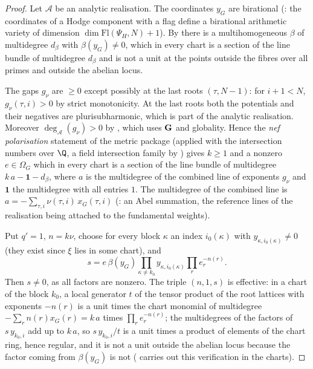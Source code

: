 \begin{proof}
Let $\mathcal A$ be an analytic realisation. The coordinates $y_G$ are birational
(: the coordinates of a Hodge component with a flag define
a birational arithmetic variety of dimension $\dim\mathrm{Fl}(\Psi_H,N)+1$). By
 there is a multihomogeneous $\beta$ of multidegree
$d_\beta$ with $\beta(y_G)\ne0$, which in every chart is a section of the line bundle of multidegree $d_\beta$ and is
not a unit at the points outside the fibres over all primes and outside the abelian locus.

The gaps $g_\nu$ are $\ge0$ except possibly at the last roots $(\tau,N-1)$: for $i+1<N$, $g_\nu(\tau,i)>0$ by
strict monotonicity. At the last roots both the potentials and their negatives are plurisubharmonic, which is part
of the analytic realisation. Moreover $\deg_{\mathcal A}(g_\nu)>0$ by
, which uses $\mathbf G$ and globality. Hence the
\emph{nef polarisation} statement of the metric package (applied with the intersection numbers over $\Q$, a field
intersection family by ) gives
$k\ge1$ and a nonzero $e\in\Omega_G$ which in every chart is a section of the line bundle of multidegree
$k\,a-\mathbf 1-d_\beta$, where $a$ is the multidegree of the combined line of exponents $g_\nu$ and $\mathbf 1$ the
multidegree with all entries $1$. The multidegree of the combined line is
$a=-\sum_{\tau,i}\nu(\tau,i)\,x_G(\tau,i)$ (: an Abel
summation, the reference lines of the realisation being attached to the fundamental weights).

Put $q'=1$, $n=k\nu$, choose for every block $\kappa$ an index $i_0(\kappa)$ with $y_{\kappa,i_0(\kappa)}\ne0$ (they
exist since $\xi$ lies in some chart), and
\[
s=e\,\beta(y_G)\prod_{\kappa\ne k_0}y_{\kappa,i_0(\kappa)}\prod_re_r^{-n(r)}.
\]
Then $s\ne0$, as all factors are nonzero. The triple $(n,1,s)$ is effective: in a chart of the block $k_0$, a local
generator $t$ of the tensor product of the root lattices with exponents $-n(r)$ is a unit times the chart monomial of
multidegree $-\sum_rn(r)x_G(r)=k\,a$ times $\prod_re_r^{-n(r)}$; the multidegrees of the factors of
$s\,y_{k_0,i}$ add up to $k\,a$, so $s\,y_{k_0,i}/t$ is a unit times a product of elements of the chart ring, hence
regular, and it is not a unit outside the abelian locus because the factor coming from $\beta(y_G)$ is not
( carries out this verification in the charts).
\end{proof}


